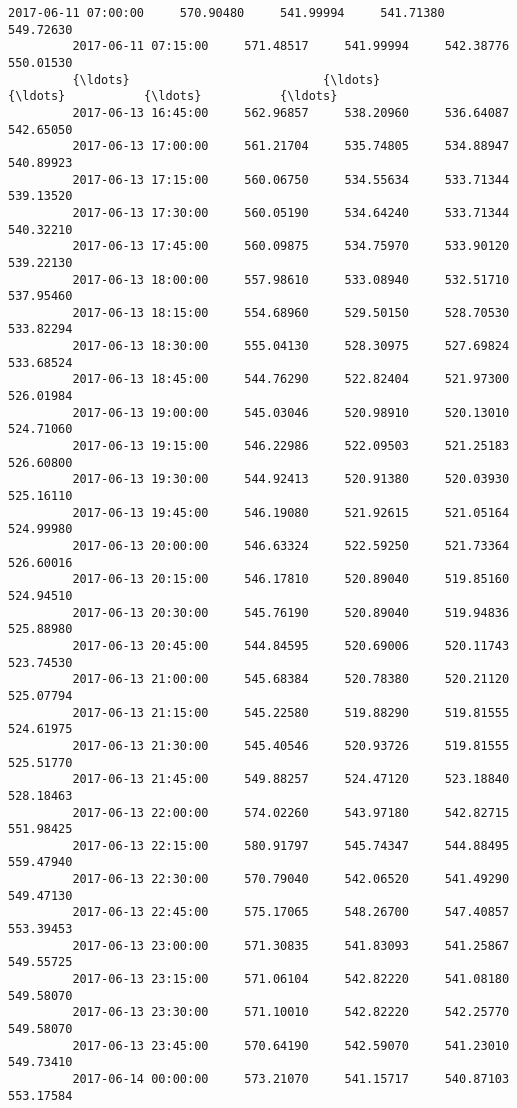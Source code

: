 \documentclass[11pt]{article}
\begin{document}
\begin{Verbatim}[commandchars=\\\{\}]
         2017-06-11 07:00:00     570.90480     541.99994     541.71380     549.72630   
         2017-06-11 07:15:00     571.48517     541.99994     542.38776     550.01530   
         {\ldots}                           {\ldots}           {\ldots}           {\ldots}           {\ldots}   
         2017-06-13 16:45:00     562.96857     538.20960     536.64087     542.65050   
         2017-06-13 17:00:00     561.21704     535.74805     534.88947     540.89923   
         2017-06-13 17:15:00     560.06750     534.55634     533.71344     539.13520   
         2017-06-13 17:30:00     560.05190     534.64240     533.71344     540.32210   
         2017-06-13 17:45:00     560.09875     534.75970     533.90120     539.22130   
         2017-06-13 18:00:00     557.98610     533.08940     532.51710     537.95460   
         2017-06-13 18:15:00     554.68960     529.50150     528.70530     533.82294   
         2017-06-13 18:30:00     555.04130     528.30975     527.69824     533.68524   
         2017-06-13 18:45:00     544.76290     522.82404     521.97300     526.01984   
         2017-06-13 19:00:00     545.03046     520.98910     520.13010     524.71060   
         2017-06-13 19:15:00     546.22986     522.09503     521.25183     526.60800   
         2017-06-13 19:30:00     544.92413     520.91380     520.03930     525.16110   
         2017-06-13 19:45:00     546.19080     521.92615     521.05164     524.99980   
         2017-06-13 20:00:00     546.63324     522.59250     521.73364     526.60016   
         2017-06-13 20:15:00     546.17810     520.89040     519.85160     524.94510   
         2017-06-13 20:30:00     545.76190     520.89040     519.94836     525.88980   
         2017-06-13 20:45:00     544.84595     520.69006     520.11743     523.74530   
         2017-06-13 21:00:00     545.68384     520.78380     520.21120     525.07794   
         2017-06-13 21:15:00     545.22580     519.88290     519.81555     524.61975   
         2017-06-13 21:30:00     545.40546     520.93726     519.81555     525.51770   
         2017-06-13 21:45:00     549.88257     524.47120     523.18840     528.18463   
         2017-06-13 22:00:00     574.02260     543.97180     542.82715     551.98425   
         2017-06-13 22:15:00     580.91797     545.74347     544.88495     559.47940   
         2017-06-13 22:30:00     570.79040     542.06520     541.49290     549.47130   
         2017-06-13 22:45:00     575.17065     548.26700     547.40857     553.39453   
         2017-06-13 23:00:00     571.30835     541.83093     541.25867     549.55725   
         2017-06-13 23:15:00     571.06104     542.82220     541.08180     549.58070   
         2017-06-13 23:30:00     571.10010     542.82220     542.25770     549.58070   
         2017-06-13 23:45:00     570.64190     542.59070     541.23010     549.73410   
         2017-06-14 00:00:00     573.21070     541.15717     540.87103     553.17584   
         

\end{Verbatim}
\end{document}
